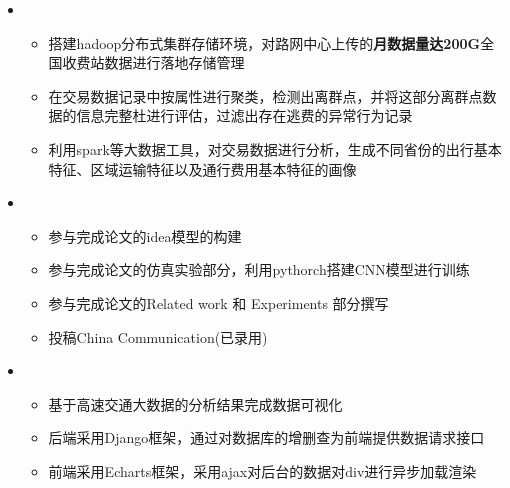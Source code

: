   \begin{itemize}[leftmargin=*]
    \item
      {\small
      \begin{itemize}
        \item 搭建hadoop分布式集群存储环境，对路网中心上传的\textbf{月数据量达200G}全国收费站数据进行落地存储管理
        \item 在交易数据记录中按属性进行聚类，检测出离群点，并将这部分离群点数据的信息完整杜进行评估，过滤出存在逃费的异常行为记录%
        \item 利用spark等大数据工具，对交易数据进行分析，生成不同省份的出行基本特征、区域运输特征以及通行费用基本特征的画像
      \end{itemize}
      }
    \item
      {\small
      \begin{itemize}
        \item 参与完成论文的idea模型的构建
        \item 参与完成论文的仿真实验部分，利用pythorch搭建CNN模型进行训练
        \item 参与完成论文的Related work 和 Experiments 部分撰写
        \item 投稿China Communication(已录用)
      \end{itemize}
      }
    \item
      {\small
      \begin{itemize}
      	\item 基于高速交通大数据的分析结果完成数据可视化
        \item 后端采用Django框架，通过对数据库的增删查为前端提供数据请求接口
        \item 前端采用Echarts框架，采用ajax对后台的数据对div进行异步加载渲染
      \end{itemize}
      }
  \end{itemize}